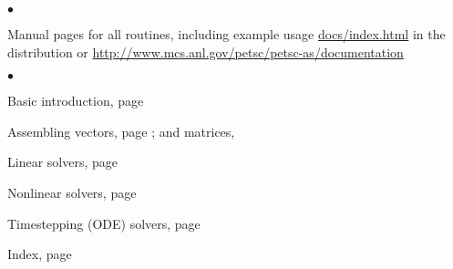 
%

\medskip\medskip


\medskip


\begin{list}{$\bullet$}
{
\setlength{\itemsep}{-.020in} 
\setlength{\topsep}{0in} 
\setlength{\partopsep}{0in}
}
\item Manual pages for all routines, including example usage
\href{index.html}{docs/index.html} in the distribution or
\href{http://www.mcs.anl.gov/petsc/petsc-as/documentation}{http://www.mcs.anl.gov/petsc/petsc-as/documentation}

\end{list}

\medskip
{}
\begin{list}{$\bullet$}
{
\setlength{\itemsep}{-.02in} 
\setlength{\topsep}{.02in} 
\setlength{\partopsep}{0in}
}
\item Basic introduction, page \pageref{sec_gettingstarted}
\item Assembling vectors, page \pageref{sec_vecbasic}; and matrices, \pageref{chapter_matrices}
\item Linear solvers, page \pageref{ch_ksp}
\item Nonlinear solvers, page \pageref{chapter_snes}
\item Timestepping (ODE) solvers, page \pageref{chapter_ts}
\item Index, page \pageref{ch_index}
\end{list}

